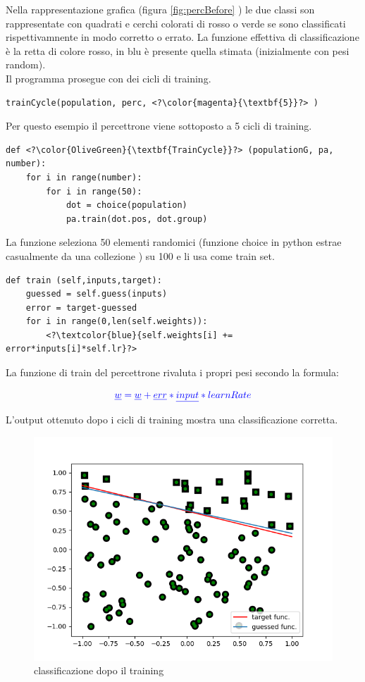 \documentclass[12pt]{article}
\begin{document}
Nella rappresentazione grafica (figura \ref{fig:percBefore} ) le due classi son rappresentate con quadrati e cerchi colorati di rosso o verde se sono classificati rispettivamnente in modo corretto o errato.
La funzione effettiva di classificazione è la retta di colore rosso, in blu è presente quella stimata (inizialmente con pesi random).\\
Il programma prosegue con dei cicli di training.
\begin{lstlisting}[language=myPython]
 trainCycle(population, perc, <?\color{magenta}{\textbf{5}}?> )
\end{lstlisting}
Per questo esempio il percettrone viene sottoposto a {\color{magenta}5} cicli di training.
\begin{lstlisting}[language=myPython]
 def <?\color{OliveGreen}{\textbf{TrainCycle}}?> (populationG, pa, number):
	for i in range(number):
		for i in range(50):
			dot = choice(population)
			pa.train(dot.pos, dot.group)
\end{lstlisting}
La funzione {} seleziona 50 elementi randomici (funzione choice in python estrae casualmente da una collezione ) su 100 e li usa come train set.
\newpage
\begin{lstlisting}[language=myPython]
 def train (self,inputs,target):
	guessed = self.guess(inputs)
	error = target-guessed
	for i in range(0,len(self.weights)):
		<?\textcolor{blue}{self.weights[i] += error*inputs[i]*self.lr}?>
\end{lstlisting}
La funzione di train del percettrone rivaluta i propri pesi secondo la formula:

$$\color{blue}\underline{w}=\underline{w}+\underline{err}*\underline{input}*learnRate$$

L'output ottenuto dopo i cicli di training mostra una classificazione corretta.
\begin{figure}[h!]
	\centering
	\includegraphics[width=10 cm]{Perc_after.png}
	\caption{classificazione dopo il training}
	\label{fig:percAfter}
\end{figure}
\newpage
\end{document}

